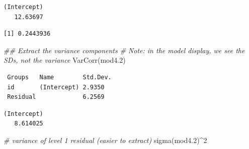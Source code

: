 \documentclass[
  letterpaper,
  DIV=11,
  numbers=noendperiod]{scrreprt}
\newenvironment{Shaded}{}{}
\newcommand{\CommentTok}[1]{\textcolor[rgb]{0.38,0.63,0.69}{\textit{#1}}}
\newcommand{\DecValTok}[1]{\textcolor[rgb]{0.25,0.63,0.44}{#1}}
\newcommand{\DocumentationTok}[1]{\textcolor[rgb]{0.73,0.13,0.13}{\textit{#1}}}
\newcommand{\FloatTok}[1]{\textcolor[rgb]{0.25,0.63,0.44}{#1}}
\newcommand{\FunctionTok}[1]{\textcolor[rgb]{0.02,0.16,0.49}{#1}}
\newcommand{\NormalTok}[1]{#1}
\newcommand{\SpecialCharTok}[1]{\textcolor[rgb]{0.25,0.44,0.63}{#1}}
\begin{document}
\begin{verbatim}
(Intercept) 
   12.63697 
\end{verbatim}

\begin{Shaded}
\end{Shaded}

\begin{verbatim}
[1] 0.2443936
\end{verbatim}

\begin{Shaded}
\begin{Highlighting}[]
\DocumentationTok{\#\# Extract the variance components}
\CommentTok{\# Note: in the model display, we see the SDs, not the variance}
\FunctionTok{VarCorr}\NormalTok{(mod4}\FloatTok{.2}\NormalTok{)}
\end{Highlighting}
\end{Shaded}

\begin{verbatim}
 Groups   Name        Std.Dev.
 id       (Intercept) 2.9350  
 Residual             6.2569  
\end{verbatim}

\begin{Shaded}
\end{Shaded}

\begin{verbatim}
(Intercept) 
   8.614025 
\end{verbatim}

\begin{Shaded}
\begin{Highlighting}[]
\CommentTok{\# variance of level 1 residual (easier to extract)}
\FunctionTok{sigma}\NormalTok{(mod4}\FloatTok{.2}\NormalTok{)}\SpecialCharTok{\^{}}\DecValTok{2} 
\end{Highlighting}
\end{Shaded}
\end{document}
